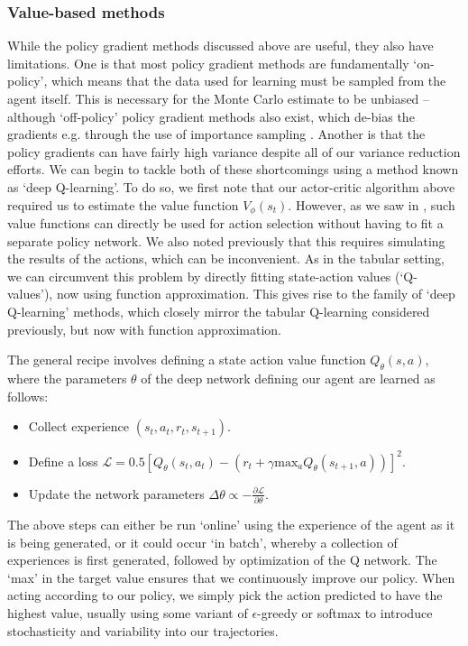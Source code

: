 
\subsubsection*{Value-based methods}

While the policy gradient methods discussed above are useful, they also have limitations.
One is that most policy gradient methods are fundamentally `on-policy', which means that the data used for learning must be sampled from the agent itself.
This is necessary for the Monte Carlo estimate to be unbiased -- although `off-policy' policy gradient methods also exist, which de-bias the gradients e.g. through the use of importance sampling \citep{espeholt2018impala,jie2010connection,peshkin2002learning}.
Another is that the policy gradients can have fairly high variance despite all of our variance reduction efforts.
We can begin to tackle both of these shortcomings using a method known as `deep Q-learning'.
To do so, we first note that our actor-critic algorithm above required us to estimate the value function $V_\phi(s_t)$.
However, as we saw in , such value functions can directly be used for action selection without having to fit a separate policy network.
We also noted previously that this requires simulating the results of the actions, which can be inconvenient.
As in the tabular setting, we can circumvent this problem by directly fitting state-action values (`Q-values'), now using function approximation.
This gives rise to the family of `deep Q-learning' methods, which closely mirror the tabular Q-learning considered previously, but now with function approximation.

The general recipe involves defining a state action value function $Q_\theta(s, a)$, where the parameters $\theta$ of the deep network defining our agent are learned as follows:
\begin{itemize}
    \item Collect experience $(s_t, a_t, r_t, s_{t+1})$.
    \item Define a loss $\mathcal{L} = 0.5 [ Q_\theta(s_t, a_t) - (r_t + \gamma \text{max}_a Q_\theta(s_{t+1}, a)) ]^2 $.
    \item Update the network parameters $\Delta \theta \propto - \frac{\partial \mathcal{L}}{\partial \theta}$.
\end{itemize}
The above steps can either be run `online' using the experience of the agent as it is being generated, or it could occur `in batch', whereby a collection of experiences is first generated, followed by optimization of the Q network.
The `max' in the target value ensures that we continuously improve our policy.
When acting according to our policy, we simply pick the action predicted to have the highest value, usually using some variant of $\epsilon$-greedy or softmax to introduce stochasticity and variability into our trajectories.


